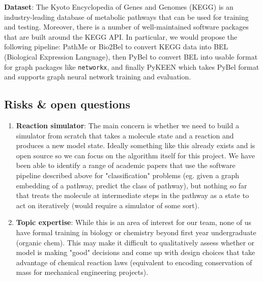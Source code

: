 \documentclass{article}
\begin{document}
\textbf{Dataset}: The Kyoto Encyclopedia of Genes and Genomes (KEGG) is an industry-leading database of metabolic pathways that can be used for training and testing. Moreover, there is a number of well-maintained software packages that are built around the KEGG API. In particular, we would propose the following pipeline: PathMe  or Bio2Bel to convert KEGG data into BEL (Biological Expression Language), then PyBel to convert BEL into usable format for graph packages like \texttt{networkx}, and finally PyKEEN which takes PyBel format and supports graph neural network training and evaluation.

\subsection{Risks \& open questions}
\begin{enumerate}
    \item \textbf{Reaction simulator}: The main concern is whether we need to build a simulator from scratch that takes a molecule state and a reaction and produces a new model state. Ideally something like this already exists and is open source so we can focus on the algorithm itself for this project. We have been able to identify a range of academic papers that use the software pipeline described above for "classification" problems (eg. given a graph embedding of a pathway, predict the class of pathway), but nothing so far that treats the molecule at intermediate steps in the pathway as a state to act on iteratively (would require a simulator of some sort). 
    
    \item \textbf{Topic expertise}: While this is an area of interest for our team, none of us have formal training in biology or chemistry beyond first year undergraduate (organic chem). This may make it difficult to qualitatively assess whether or model is making "good" decisions and come up with design choices that take advantage of chemical reaction laws (equivalent to encoding conservation of mass for mechanical engineering projects).
\end{enumerate}
\end{document}
